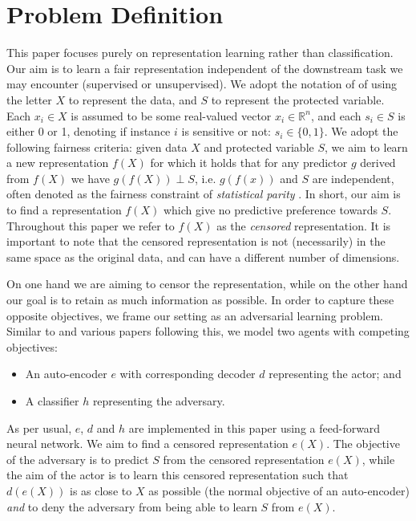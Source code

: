\documentclass[nohyperref]{article}
\theoremstyle{plain}
\theoremstyle{definition}
\theoremstyle{remark}
\newcommand{\indep}{\perp}
\begin{document}
\section{Problem Definition}
\label{problem_definition}
This paper focuses purely on representation learning rather than classification. Our aim is to learn a fair representation independent of the downstream task we may encounter (supervised or unsupervised). We adopt the notation of \cite{edwards2016censoring} of using the letter $X$ to represent the data, and $S$ to represent the protected variable. Each $x_i \in X$ is assumed to be some real-valued vector $x_i \in \mathbb{R}^n$, and each $s_i \in S$ is either 0 or 1, denoting if instance $i$ is sensitive or not: $s_i \in \{0,1\}$. We adopt the following fairness criteria: given data $X$ and protected variable $S$, we aim to learn a new representation $f(X)$ for which it holds that for any predictor $g$ derived from $f(X)$ we have $g(f(X)) \indep S$, i.e. $g(f(x))$ and $S$ are independent, often denoted as the fairness constraint of \emph{statistical parity} \cite{10.1145/2090236.2090255}. In short, our aim is to find a representation $f(X)$ which give no predictive preference towards $S$. Throughout this paper we refer to $f(X)$ as the \emph{censored} representation. It is important to note that the censored representation is not (necessarily) in the same space as the original data, and can have a different number of dimensions.

On one hand we are aiming to censor the representation, while on the other hand our goal is to retain as much information as possible. In order to capture these opposite objectives, we frame our setting as an adversarial learning problem. Similar to \cite{edwards2016censoring} and various papers following this, we model two agents with competing objectives:
\begin{itemize}
\item An auto-encoder $e$ with corresponding decoder $d$ representing the actor; and 
\item A classifier $h$ representing the adversary.
\end{itemize}
As per usual, $e$, $d$ and $h$ are implemented in this paper using a feed-forward neural network. We aim to find a censored representation $e(X)$. The objective of the adversary is to predict $S$ from the censored representation $e(X)$, while the aim of the actor is to learn this censored representation such that $d(e(X))$ is as close to $X$ as possible (the normal objective of an auto-encoder) \emph{and} to deny the adversary from being able to learn $S$ from $e(X)$.
\end{document}

